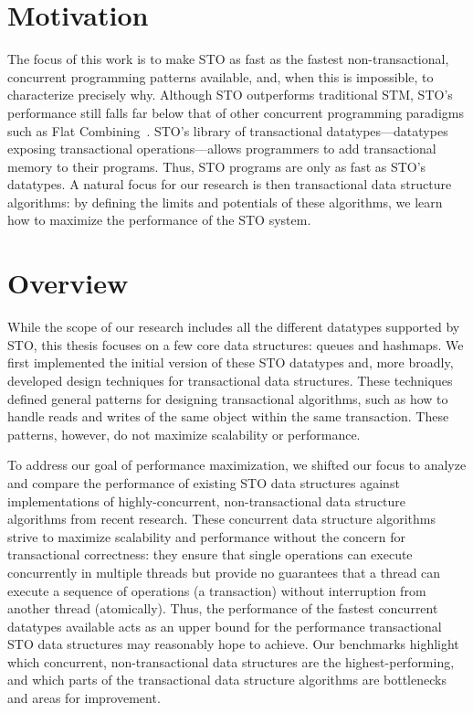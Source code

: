 \section{Motivation}
The focus of this work is to make STO as fast as the fastest non-transactional, concurrent programming patterns available, and, when this is impossible, to characterize precisely why. Although STO outperforms traditional STM, STO’s performance still falls far below that of other concurrent programming paradigms such as Flat Combining~\cite{flatcombining}. STO’s library of transactional datatypes---datatypes exposing transactional operations---allows programmers to add transactional memory to their programs. Thus, STO programs are only as fast as STO's datatypes. A natural focus for our research is then transactional data structure algorithms: by defining the limits and potentials of these algorithms, we learn how to maximize the performance of the STO system.

\section{Overview}
While the scope of our research includes all the different datatypes supported by STO, this thesis focuses on a few core data structures: queues and hashmaps. We first implemented the initial version of these STO datatypes and, more broadly, developed design techniques for transactional data structures. These techniques defined general patterns for designing transactional algorithms, such as how to handle reads and writes of the same object within the same transaction. These patterns, however, do not maximize scalability or performance.

To address our goal of performance maximization, we shifted our focus to analyze and compare the performance of existing STO data structures against implementations of highly-concurrent, non-transactional data structure algorithms from recent research. These concurrent data structure algorithms strive to maximize scalability and performance without the concern for transactional correctness: they ensure that single operations can execute concurrently in multiple threads but provide no guarantees that a thread can execute a sequence of operations (a transaction) without interruption from another thread (atomically).
Thus, the performance of the fastest concurrent datatypes available acts as an upper bound for the performance transactional STO data structures may reasonably hope to achieve. Our benchmarks highlight which concurrent, non-transactional data structures are the highest-performing, and which parts of the transactional data structure algorithms are bottlenecks and areas for improvement. 

